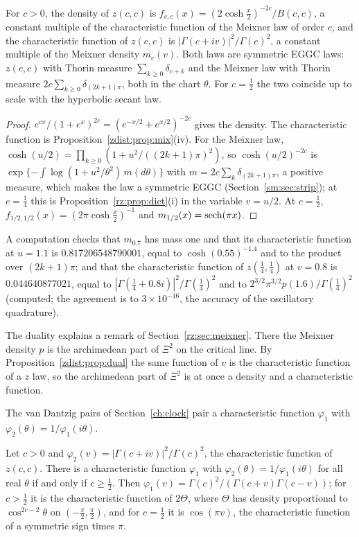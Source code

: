 \begin{proposition}\label{zdist:prop:dual}
For $c>0$, the density of $z(c,c)$ is $f_{c,c}(x)=(2\cosh\frac x2)^{-2c}/B(c,c)$, a constant multiple of the characteristic function of the Meixner law of order $c$, and the characteristic function of $z(c,c)$ is $|\Gamma(c+iv)|^2/\Gamma(c)^2$, a constant multiple of the Meixner density $m_c(v)$. Both laws are symmetric EGGC laws: $z(c,c)$ with Thorin measure $\sum_{k\ge0}\delta_{c+k}$ and the Meixner law with Thorin measure $2c\sum_{k\ge0}\delta_{(2k+1)\pi}$, both in the chart $\theta$. For $c=\frac12$ the two coincide up to scale with the hyperbolic secant law.
\end{proposition}

\begin{proof}
$e^{cx}/(1+e^x)^{2c}=(e^{-x/2}+e^{x/2})^{-2c}$ gives the density. The characteristic function is Proposition~\ref{zdist:prop:mix}(iv). For the Meixner law, $\cosh(u/2)=\prod_{k\ge0}(1+u^2/((2k+1)\pi)^2)$, so $\cosh(u/2)^{-2c}$ is $\exp\{-\int\log(1+u^2/\theta^2)\,m(d\theta)\}$ with $m=2c\sum_k\delta_{(2k+1)\pi}$, a positive measure, which makes the law a symmetric EGGC (Section~\ref{sm:sec:strip}); at $c=\frac14$ this is Proposition~\ref{rz:prop:dict}(i) in the variable $v=u/2$. At $c=\frac12$, $f_{1/2,1/2}(x)=(2\pi\cosh\frac x2)^{-1}$ and $m_{1/2}(x)=\operatorname{sech}(\pi x)$.
\end{proof}

A computation checks that $m_{0.7}$ has mass one and that its characteristic function at $u=1.1$ is $0.817206548790001$, equal to $\cosh(0.55)^{-1.4}$ and to the product over $(2k+1)\pi$; and that the characteristic function of $z(\frac14,\frac14)$ at $v=0.8$ is $0.044640877021$, equal to $|\Gamma(\frac14+0.8i)|^2/\Gamma(\frac14)^2$ and to $2^{3/2}\pi^{3/2}p(1.6)/\Gamma(\frac14)^2$ (computed; the agreement is to $3\times10^{-16}$, the accuracy of the oscillatory quadrature).

The duality explains a remark of Section~\ref{rz:sec:meixner}. There the Meixner density $p$ is the archimedean part of $\Xi^2$ on the critical line. By Proposition~\ref{zdist:prop:dual} the same function of $v$ is the characteristic function of a $z$ law, so the archimedean part of $\Xi^2$ is at once a density and a characteristic function.

The van Dantzig pairs of Section~\ref{ch:clock} pair a characteristic function $\varphi_1$ with $\varphi_2(\theta)=1/\varphi_1(i\theta)$.

\begin{proposition}\label{zdist:prop:vd}
Let $c>0$ and $\varphi_2(v)=|\Gamma(c+iv)|^2/\Gamma(c)^2$, the characteristic function of $z(c,c)$. There is a characteristic function $\varphi_1$ with $\varphi_2(\theta)=1/\varphi_1(i\theta)$ for all real $\theta$ if and only if $c\ge\frac12$. Then $\varphi_1(v)=\Gamma(c)^2/(\Gamma(c+v)\Gamma(c-v))$; for $c>\frac12$ it is the characteristic function of $2\Theta$, where $\Theta$ has density proportional to $\cos^{2c-2}\theta$ on $(-\frac\pi2,\frac\pi2)$, and for $c=\frac12$ it is $\cos(\pi v)$, the characteristic function of a symmetric sign times $\pi$.
\end{proposition}

